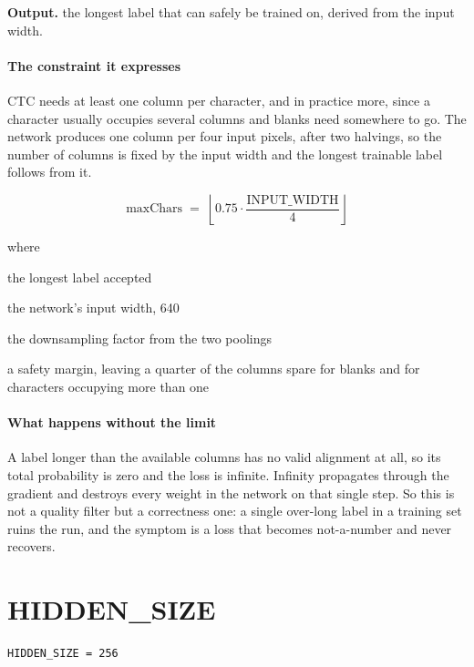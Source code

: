 \noindent\textbf{Output.} the longest label that can safely be trained on, derived from the input width.


\paragraph{The constraint it expresses}
CTC needs at least one column per character, and in practice more, since a character usually occupies several columns and blanks need somewhere to go. The network produces one column per four input pixels, after two halvings, so the number of columns is fixed by the input width and the longest trainable label follows from it.


\begin{equation}
\mathrm{maxChars} \;=\; \left\lfloor 0.75 \cdot \frac{\mathrm{INPUT\_WIDTH}}{4} \right\rfloor
\end{equation}

\noindent where
\begin{description}[leftmargin=2.4em,style=nextline,font=\normalfont\ttfamily]\setlength\itemsep{1pt}
  \item[{$\mathrm{maxChars}$}] \normalfont the longest label accepted
  \item[{$\mathrm{INPUT\_WIDTH}$}] \normalfont the network's input width, 640
  \item[{$4$}] \normalfont the downsampling factor from the two poolings
  \item[{$0.75$}] \normalfont a safety margin, leaving a quarter of the columns spare for blanks and for characters occupying more than one
\end{description}

\paragraph{What happens without the limit}
A label longer than the available columns has no valid alignment at all, so its total probability is zero and the loss is infinite. Infinity propagates through the gradient and destroys every weight in the network on that single step. So this is not a quality filter but a correctness one: a single over-long label in a training set ruins the run, and the symptom is a loss that becomes not-a-number and never recovers.


\section{HIDDEN\_SIZE}
\begin{lstlisting}[style=sig]
HIDDEN_SIZE = 256
\end{lstlisting}

